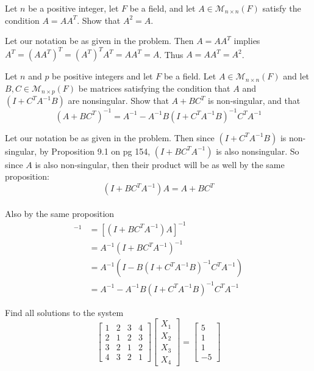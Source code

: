 \documentclass{article}
\begin{document}
\setcounter{problem}{515}
\begin{problem}
Let $n$ be a positive integer, let $F$ be a field, and let $A \in \mathcal{M}_{n\times n}(F)$ satisfy the condition $A=AA^{T}$. Show that $A^{2}=A$.
\end{problem}

\begin{solution}
Let our notation be as given in the problem. Then $A=AA^{T}$ implies $A^{T}=(AA^{T})^{T}=(A^{T})^{T}A^{T}=AA^{T}=A$. Thus $A=AA^{T}=A^{2}$.
\end{solution}

\setcounter{problem}{541}
\begin{problem}
Let $n$ and $p$ be positive integers and let $F$ be a field. Let $A \in \mathcal{M}_{n\times n}(F)$ and let $B,C \in \mathcal{M}_{n\times p}(F)$ be matrices satisfying the condition that $A$ and $(I+C^{T}A^{-1}B)$ are nonsingular. Show that $A+BC^{T}$ is non-singular, and that
\[ 
\left( A +BC^{T} \right)^{-1} = A^{-1} - A^{-1}B\left( I+C^{T}A^{-1}B \right)^{-1}C^{T}A^{-1}
\]
\end{problem}

\begin{solution}
Let our notation be as given in the problem. Then since $(I+C^{T}A^{-1}B)$ is non-singular, by Proposition 9.1 on pg 154, $(I+BC^{T}A^{-1})$ is also nonsingular. So since $A$ is also non-singular, then their product will be as well by the same proposition:
\[ (I+BC^{T}A^{-1})A = A+BC^{T} \]

\paragraph{}
Also by the same proposition
\begin{align*}
[A+BC^{T}]^{-1} &= [(I+BC^{T}A^{-1})A]^{-1} \\
&= A^{-1}(I+BC^{T}A^{-1})^{-1} \\
&= A^{-1}( I - B(I+C^{T}A^{-1}B)^{-1}C^{T}A^{-1} ) \\
&= A^{-1} - A^{-1}B(I+C^{T}A^{-1}B)^{-1}C^{T}A^{-1}
\end{align*}
\end{solution}

\setcounter{section}{10}
\setcounter{problem}{584}
\begin{problem}
Find all solutions to the system
\[
\begin{bmatrix}
1 & 2 & 3 & 4 \\
2 & 1 & 2 & 3 \\
3 & 2 & 1 & 2 \\
4 & 3 & 2 & 1
\end{bmatrix}
\begin{bmatrix}
X_{1}\\ X_{2}\\ X_{3}\\ X_{4}
\end{bmatrix}
=
\begin{bmatrix}
5\\ 1\\ 1\\ -5
\end{bmatrix}
\]
\end{problem}
\end{document}
